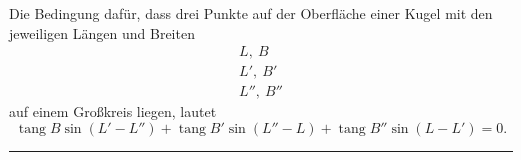Die Bedingung dafür, dass drei Punkte auf der Oberfläche einer Kugel mit den jeweiligen Längen und
Breiten
\[
\begin{array}{l}
L,\ B\\
L',\ B'\\
L'',\ B''
\end{array}
\]
\noindent auf einem Großkreis liegen, lautet
\[
\operatorname{tang}B\sin(L'-L'')+\operatorname{tang}B'\sin(L''-L)+
\operatorname{tang}B''\sin(L-L')=0.
\]

\begin{center}\rule{.18\textwidth}{.4pt}\end{center}

\par\clearpage
\noindent{}\makebox[12mm][r]{}\par\medskip

